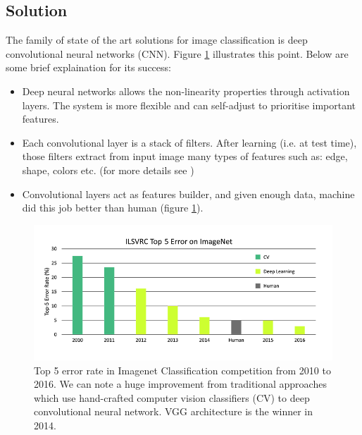 \subsection{Solution}
The family of state of the art solutions for image classification is deep convolutional neural networks (CNN). Figure \ref{fig:imagenetTop5Err} illustrates this point. Below are some brief explaination for its success:
\begin{itemize}
	\item Deep neural networks allows the non-linearity properties through activation layers. The system is more flexible and can self-adjust to prioritise important features.
	\item Each convolutional layer is a stack of filters. After learning (i.e. at test time), those filters extract from input image many types of features such as: edge, shape, colors etc. (for more details see \cite{DeepVis:2015})
	\item Convolutional layers act as features builder, and given enough data, machine did this job better than human (figure \ref{fig:imagenetTop5Err}).
\end{itemize}


\begin{figure}[tb]
\centering
\includegraphics[width=0.9\hsize]{./figures/imagenetTop5Err}
\caption{Top 5 error rate in Imagenet Classification competition from 2010 to 2016. We can note a huge improvement from traditional approaches which use hand-crafted computer vision classifiers (CV) to deep convolutional neural network. VGG architecture is the winner in 2014.}
\label{fig:imagenetTop5Err}
\end{figure}


